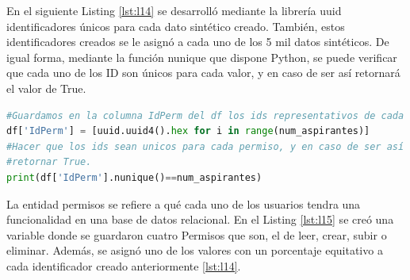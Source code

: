 \documentclass[10pt, oneside,spanish]{article}   	%
\begin{document}
En el siguiente Listing \ref{lst:l14} se desarrolló mediante la librería uuid identificadores únicos para cada dato sintético creado. También, estos identificadores creados se le asignó a cada uno de los 5 mil datos sintéticos. De igual forma, mediante la función nunique que dispone Python, se puede verificar que cada uno de los ID son únicos para cada valor, y en caso de ser así retornará el valor de True.
\begin{lstlisting}[language=Python,label={lst:l14},caption=Atributo IdPerm para la entidad Permisos,frame=single, ]
#Guardamos en la columna IdPerm del df los ids representativos de cada permiso.
df['IdPerm'] = [uuid.uuid4().hex for i in range(num_aspirantes)]
#Hacer que los ids sean unicos para cada permiso, y en caso de ser así 
#retornar True.
print(df['IdPerm'].nunique()==num_aspirantes)
\end{lstlisting}
La entidad permisos se refiere a qué cada uno de los usuarios tendra una funcionalidad en una base de datos relacional. En el Listing \ref{lst:l15} se creó una variable donde se guardaron cuatro Permisos que son, el de leer, crear, subir o eliminar. Además, se asignó uno de los valores con un porcentaje equitativo a cada identificador creado anteriormente \ref{lst:l14}.
\end{document}
